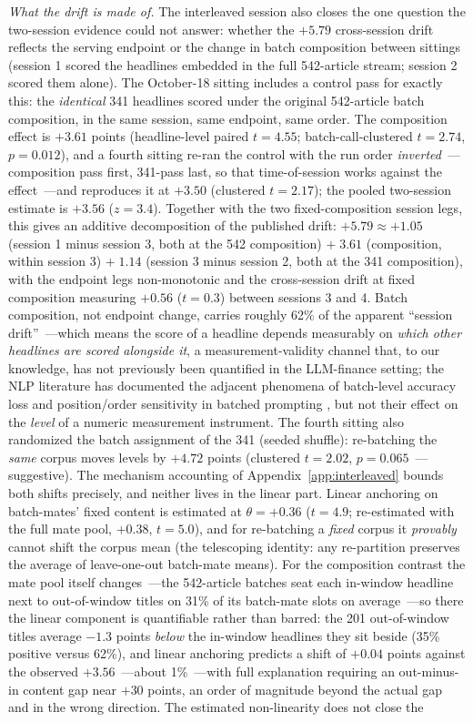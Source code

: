 \emph{What the drift is made of.} The interleaved session also closes the one question the two-session evidence could not answer: whether the $+5.79$ cross-session drift reflects the serving endpoint or the change in batch composition between sittings (session 1 scored the headlines embedded in the full 542-article stream; session 2 scored them alone). The October-18 sitting includes a control pass for exactly this: the \emph{identical} 341 headlines scored under the original 542-article batch composition, in the same session, same endpoint, same order. The composition effect is $+3.61$ points (headline-level paired $t=4.55$; batch-call-clustered $t=2.74$, $p=0.012$), and a fourth sitting re-ran the control with the run order \emph{inverted}~---composition pass first, 341-pass last, so that time-of-session works against the effect~---and reproduces it at $+3.50$ (clustered $t=2.17$); the pooled two-session estimate is $+3.56$ ($z=3.4$). Together with the two fixed-composition session legs, this gives an additive decomposition of the published drift: $+5.79 \approx +1.05$ (session 1 minus session 3, both at the 542 composition) $+\;3.61$ (composition, within session 3) $+\;1.14$ (session 3 minus session 2, both at the 341 composition), with the endpoint legs non-monotonic and the cross-session drift at fixed composition measuring $+0.56$ ($t=0.3$) between sessions 3 and 4. Batch composition, not endpoint change, carries roughly 62\% of the apparent ``session drift''~---which means the score of a headline depends measurably on \emph{which other headlines are scored alongside it}, a measurement-validity channel that, to our knowledge, has not previously been quantified in the LLM-finance setting; the NLP literature has documented the adjacent phenomena of batch-level accuracy loss and position/order sensitivity in batched prompting \citep{lin2024batch,liu2024lost,zheng2024}, but not their effect on the \emph{level} of a numeric measurement instrument. The fourth sitting also randomized the batch assignment of the 341 (seeded shuffle): re-batching the \emph{same} corpus moves levels by $+4.72$ points (clustered $t=2.02$, $p=0.065$~---suggestive). The mechanism accounting of Appendix~\ref{app:interleaved} bounds both shifts precisely, and neither lives in the linear part. Linear anchoring on batch-mates' fixed content is estimated at $\theta=+0.36$ ($t=4.9$; re-estimated with the full mate pool, $+0.38$, $t=5.0$), and for re-batching a \emph{fixed} corpus it \emph{provably} cannot shift the corpus mean (the telescoping identity: any re-partition preserves the average of leave-one-out batch-mate means). For the composition contrast the mate pool itself changes~---the 542-article batches seat each in-window headline next to out-of-window titles on 31\% of its batch-mate slots on average~---so there the linear component is quantifiable rather than barred: the 201 out-of-window titles average $-1.3$ points \emph{below} the in-window headlines they sit beside (35\% positive versus 62\%), and linear anchoring predicts a shift of $+0.04$ points against the observed $+3.56$~---about 1\%~---with full explanation requiring an out-minus-in content gap near $+30$ points, an order of magnitude beyond the actual gap and in the wrong direction. The estimated non-linearity does not close the 
